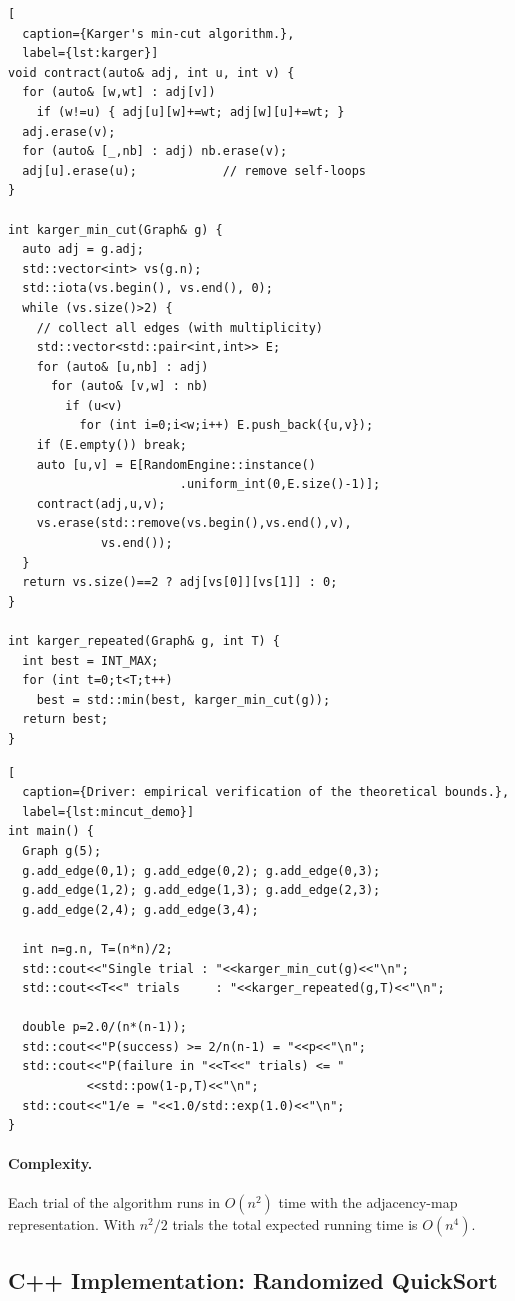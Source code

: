 \documentclass[twoside,12pt]{book}
\theoremstyle{plain}
\theoremstyle{definition}
\theoremstyle{remark}
\begin{document}
\begin{lstlisting}[
  caption={Karger's min-cut algorithm.},
  label={lst:karger}]
void contract(auto& adj, int u, int v) {
  for (auto& [w,wt] : adj[v])
    if (w!=u) { adj[u][w]+=wt; adj[w][u]+=wt; }
  adj.erase(v);
  for (auto& [_,nb] : adj) nb.erase(v);
  adj[u].erase(u);            // remove self-loops
}

int karger_min_cut(Graph& g) {
  auto adj = g.adj;
  std::vector<int> vs(g.n);
  std::iota(vs.begin(), vs.end(), 0);
  while (vs.size()>2) {
    // collect all edges (with multiplicity)
    std::vector<std::pair<int,int>> E;
    for (auto& [u,nb] : adj)
      for (auto& [v,w] : nb)
        if (u<v)
          for (int i=0;i<w;i++) E.push_back({u,v});
    if (E.empty()) break;
    auto [u,v] = E[RandomEngine::instance()
                        .uniform_int(0,E.size()-1)];
    contract(adj,u,v);
    vs.erase(std::remove(vs.begin(),vs.end(),v),
             vs.end());
  }
  return vs.size()==2 ? adj[vs[0]][vs[1]] : 0;
}

int karger_repeated(Graph& g, int T) {
  int best = INT_MAX;
  for (int t=0;t<T;t++)
    best = std::min(best, karger_min_cut(g));
  return best;
}
\end{lstlisting}

\begin{lstlisting}[
  caption={Driver: empirical verification of the theoretical bounds.},
  label={lst:mincut_demo}]
int main() {
  Graph g(5);
  g.add_edge(0,1); g.add_edge(0,2); g.add_edge(0,3);
  g.add_edge(1,2); g.add_edge(1,3); g.add_edge(2,3);
  g.add_edge(2,4); g.add_edge(3,4);

  int n=g.n, T=(n*n)/2;
  std::cout<<"Single trial : "<<karger_min_cut(g)<<"\n";
  std::cout<<T<<" trials     : "<<karger_repeated(g,T)<<"\n";

  double p=2.0/(n*(n-1));
  std::cout<<"P(success) >= 2/n(n-1) = "<<p<<"\n";
  std::cout<<"P(failure in "<<T<<" trials) <= "
           <<std::pow(1-p,T)<<"\n";
  std::cout<<"1/e = "<<1.0/std::exp(1.0)<<"\n";
}
\end{lstlisting}

\paragraph{Complexity.}
Each trial of the algorithm runs in $O(n^2)$ time with the adjacency-map
representation.  With $n^2/2$ trials the total expected running time is
$O(n^4)$.

\subsection{C++ Implementation: Randomized QuickSort}
\end{document}
